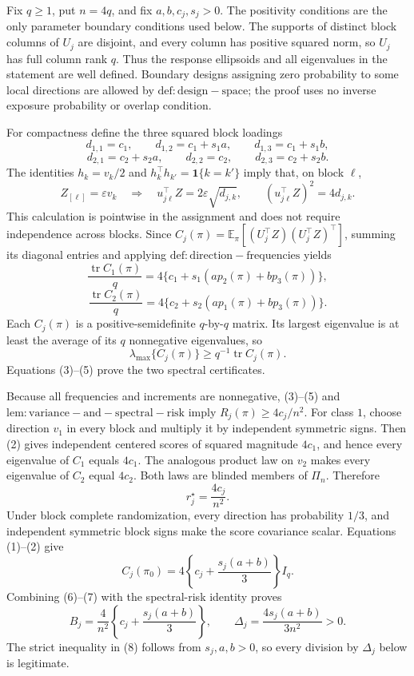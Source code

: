 Fix \(q\ge1\), put \(n=4q\), and fix \(a,b,c_j,s_j>0\). The positivity conditions are the only parameter boundary conditions used below. The supports of distinct block columns of \(U_j\) are disjoint, and every column has positive squared norm, so \(U_j\) has full column rank \(q\). Thus the response ellipsoids and all eigenvalues in the statement are well defined. Boundary designs assigning zero probability to some local directions are allowed by \(\mathrm{def:design-space}\); the proof uses no inverse exposure probability or overlap condition.

For compactness define the three squared block loadings
\[
d_{1,1}=c_1,\qquad d_{1,2}=c_1+s_1a,\qquad d_{1,3}=c_1+s_1b,
\]
\[
d_{2,1}=c_2+s_2a,\qquad d_{2,2}=c_2,\qquad d_{2,3}=c_2+s_2b. \tag{1}
\]
The identities \(h_k=v_k/2\) and \(h_k^\top h_{k'}=\mathbf 1\{k=k'\}\) imply that, on block \(\ell\),
\[
Z_{[\ell]}=\varepsilon v_k
\quad\Longrightarrow\quad
u_{j\ell}^\top Z=2\varepsilon\sqrt{d_{j,k}},
\qquad
(u_{j\ell}^\top Z)^2=4d_{j,k}. \tag{2}
\]
This calculation is pointwise in the assignment and does not require independence across blocks. Since \(C_j(\pi)=\mathbb E_\pi[(U_j^\top Z)(U_j^\top Z)^\top]\), summing its diagonal entries and applying \(\mathrm{def:direction-frequencies}\) yields
\[
\frac{\operatorname{tr}C_1(\pi)}q
=4\{c_1+s_1(ap_2(\pi)+bp_3(\pi))\}, \tag{3}
\]
\[
\frac{\operatorname{tr}C_2(\pi)}q
=4\{c_2+s_2(ap_1(\pi)+bp_3(\pi))\}. \tag{4}
\]
Each \(C_j(\pi)\) is a positive-semidefinite \(q\)-by-\(q\) matrix. Its largest eigenvalue is at least the average of its \(q\) nonnegative eigenvalues, so
\[
\lambda_{\max}\{C_j(\pi)\}\ge q^{-1}\operatorname{tr}C_j(\pi). \tag{5}
\]
Equations (3)--(5) prove the two spectral certificates.

Because all frequencies and increments are nonnegative, (3)--(5) and \(\mathrm{lem:variance-and-spectral-risk}\) imply \(R_j(\pi)\ge4c_j/n^2\). For class \(1\), choose direction \(v_1\) in every block and multiply it by independent symmetric signs. Then (2) gives independent centered scores of squared magnitude \(4c_1\), and hence every eigenvalue of \(C_1\) equals \(4c_1\). The analogous product law on \(v_2\) makes every eigenvalue of \(C_2\) equal \(4c_2\). Both laws are blinded members of \(\Pi_n\). Therefore
\[
r_j^\star=\frac{4c_j}{n^2}. \tag{6}
\]
Under block complete randomization, every direction has probability \(1/3\), and independent symmetric block signs make the score covariance scalar. Equations (1)--(2) give
\[
C_j(\pi_0)=4\left\{c_j+\frac{s_j(a+b)}3\right\}I_q. \tag{7}
\]
Combining (6)--(7) with the spectral-risk identity proves
\[
B_j=\frac4{n^2}\left\{c_j+\frac{s_j(a+b)}3\right\},
\qquad
\Delta_j=\frac{4s_j(a+b)}{3n^2}>0. \tag{8}
\]
The strict inequality in (8) follows from \(s_j,a,b>0\), so every division by \(\Delta_j\) below is legitimate.

